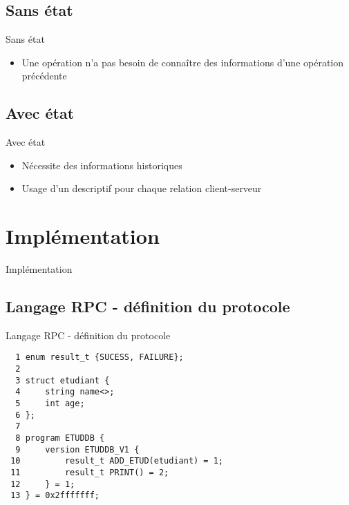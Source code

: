\section{\sectitle}
\begin{frame}{\sectitle}
    \def\subsectitle{Sans état}
    \subsection{\subsectitle}
    \begin{block}{\subsectitle}
        \begin{itemize}
            \item Une opération n'a pas besoin de connaître des informations
                d'une opération précédente
        \end{itemize}
    \end{block}
    \def\subsectitle{Avec état}
    \subsection{\subsectitle}
    \begin{block}{\subsectitle}
        \begin{itemize}
            \item Nécessite des informations historiques
            \item Usage d'un descriptif pour chaque relation client-serveur
        \end{itemize}
    \end{block}
\end{frame}

\def\sectitle{Implémentation}
\section{\sectitle}
\begin{frame}[containsverbatim]{\sectitle}
    \def\subsectitle{Langage RPC - définition du protocole}
    \subsection{\subsectitle}
    \begin{exampleblock}{\subsectitle}
        \begin{verbatim}
  1 enum result_t {SUCESS, FAILURE};
  2 
  3 struct etudiant {
  4     string name<>;
  5     int age;
  6 };
  7 
  8 program ETUDDB {
  9     version ETUDDB_V1 {
 10         result_t ADD_ETUD(etudiant) = 1;
 11         result_t PRINT() = 2;
 12     } = 1;
 13 } = 0x2fffffff;
        \end{verbatim}
    \end{exampleblock}
\end{frame}

